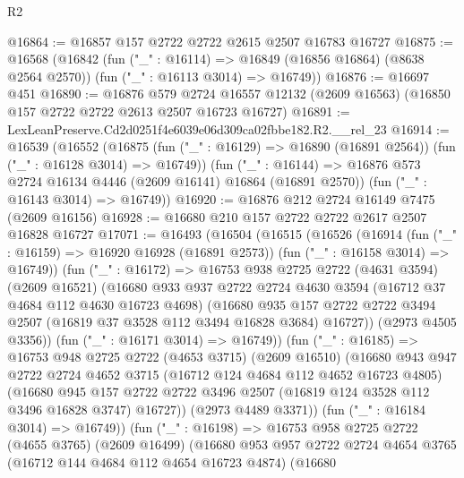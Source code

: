 \begin{lexlean}{R2}
\begin{coremodule}
@16864 := @16857 @157 @2722 @2722 @2615 @2507 @16783 @16727
@16875 := @16568
    (@16842
      (fun ("_" : @16114) => @16849 (@16856 @16864) (@8638 @2564 @2570))
      (fun ("_" : @16113 @3014) => @16749))
@16876 := @16697 @451
@16890 := @16876
    @579
    @2724
    @16557
    @12132
    (@2609 @16563)
    (@16850 @157 @2722 @2722 @2613 @2507 @16723 @16727)
@16891 := LexLeanPreserve.Cd2d0251f4e6039e06d309ca02fbbe182.R2.__rel_23
@16914 := @16539
    (@16552
      (@16875 (fun ("_" : @16129) => @16890 (@16891 @2564)) (fun ("_" : @16128 @3014) => @16749))
      (fun ("_" : @16144) => @16876 @573 @2724 @16134 @4446 (@2609 @16141) @16864 (@16891 @2570))
      (fun ("_" : @16143 @3014) => @16749))
@16920 := @16876 @212 @2724 @16149 @7475 (@2609 @16156)
@16928 := @16680 @210 @157 @2722 @2722 @2617 @2507 @16828 @16727
@17071 := @16493
    (@16504
      (@16515
        (@16526
          (@16914
            (fun ("_" : @16159) => @16920 @16928 (@16891 @2573))
            (fun ("_" : @16158 @3014) => @16749))
          (fun ("_" : @16172) =>
          @16753
            @938
            @2725
            @2722
            (@4631 @3594)
            (@2609 @16521)
            (@16680
              @933
              @937
              @2722
              @2724
              @4630
              @3594
              (@16712 @37 @4684 @112 @4630 @16723 @4698)
              (@16680
                @935
                @157
                @2722
                @2722
                @3494
                @2507
                (@16819 @37 @3528 @112 @3494 @16828 @3684)
                @16727))
            (@2973 @4505 @3356))
          (fun ("_" : @16171 @3014) => @16749))
        (fun ("_" : @16185) =>
        @16753
          @948
          @2725
          @2722
          (@4653 @3715)
          (@2609 @16510)
          (@16680
            @943
            @947
            @2722
            @2724
            @4652
            @3715
            (@16712 @124 @4684 @112 @4652 @16723 @4805)
            (@16680
              @945
              @157
              @2722
              @2722
              @3496
              @2507
              (@16819 @124 @3528 @112 @3496 @16828 @3747)
              @16727))
          (@2973 @4489 @3371))
        (fun ("_" : @16184 @3014) => @16749))
      (fun ("_" : @16198) =>
      @16753
        @958
        @2725
        @2722
        (@4655 @3765)
        (@2609 @16499)
        (@16680
          @953
          @957
          @2722
          @2724
          @4654
          @3765
          (@16712 @144 @4684 @112 @4654 @16723 @4874)
          (@16680

\end{coremodule}
\end{lexlean}
